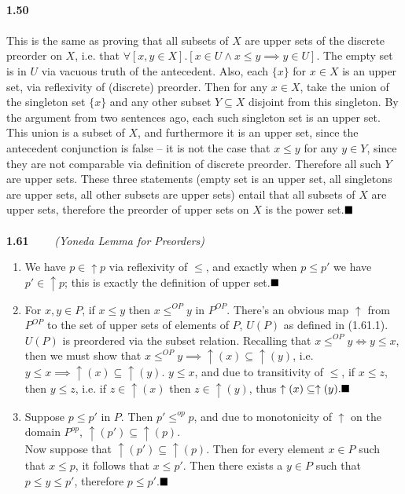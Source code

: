 \documentclass{article}
\begin{document}
 \\
\textbf{1.50}\\
 \\
This is the same as proving that all subsets of $X$ are upper sets of the discrete preorder on $X$, i.e. that $\forall \left[x,y\in X\right].\left[ x\in U \wedge x\leq y \implies y\in U \right]$. The empty set is in $U$ via vacuous truth of the antecedent. Also, each $\{ x\}$ for $x\in X$ is an upper set, via reflexivity of (discrete) preorder. Then for any $x\in X$, take the union of the singleton set $\{ x \}$ and any other subset $Y\subseteq X$ disjoint from this singleton. By the argument from two sentences ago, each such singleton set is an upper set. This union is a subset of $X$, and furthermore it is an upper set, since the antecedent conjunction is false – it is not the case that $x\leq y$ for any $y\in Y$, since they are not comparable via definition of discrete preorder. Therefore all such $Y$ are upper sets. These three statements (empty set is an upper set, all singletons are upper sets, all other subsets are upper sets) entail that all subsets of $X$ are upper sets, therefore the preorder of upper sets on $X$ is the power set.$\hfill\blacksquare$\\
 \\
 \textbf{1.61} \ \ \ \ \textit{(Yoneda Lemma for Preorders)}
 \begin{enumerate}
 	\item We have $p\in \uparrow p$ via reflexivity of $\leq$, and exactly when $p\leq p'$ we have $p'\in\uparrow p$; this is exactly the definition of upper set.$\hfill\blacksquare$
 	\item For $x,y\in P$, if $x\leq y$ then $x\leq^{OP} y$ in $P^{OP}$. There's an obvious map $\uparrow$ from $P^{OP}$ to the set of upper sets of elements of $P$, $U(P)$ as defined in (1.61.1). $U(P)$ is preordered via the subset relation. Recalling that $x\leq^{OP} y\iff y\leq x$, then we must show that $x\leq^{OP}y \implies \uparrow (x)\subseteq \uparrow (y)$, i.e. $y\leq x\implies \uparrow (x)\subseteq \uparrow (y)$. $y\leq x$, and due to transitivity of $\leq$, if $x\leq z$, then $y\leq z$, i.e. if $z\in\uparrow (x)$ then $z\in\uparrow (y)$, thus $\uparrow (x)\subseteq \uparrow (y).\hfill\blacksquare$
 	\item Suppose $p\leq p'$ in $P$. Then $p'\leq^{op} p$, and due to monotonicity of $\uparrow$ on the domain $P^{op}$, $\uparrow (p')\subseteq \uparrow (p)$.\\
 	Now suppose that $\uparrow (p')\subseteq \uparrow (p)$. Then for every element $x\in P$ such that $x\leq p$, it follows that $x\leq p'$. Then there exists a $y\in P$ such that $p\leq y\leq p'$, therefore $p\leq p'$.$\hfill\blacksquare$
 \end{enumerate}\bigskip
\end{document}
